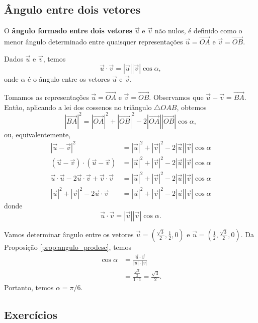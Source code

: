 \subsection{Ângulo entre dois vetores}

O {\bf ângulo formado entre dois vetores} $\vec{u}$ e $\vec{v}$ não nulos, é definido como o menor ângulo determinado entre quaisquer representações $\vec{u} = \overrightarrow{OA}$ e $\vec{v} = \overrightarrow{OB}$.

\begin{prop}\label{prop:angulo_prodesc}
  Dados $\vec{u}$ e $\vec{v}$, temos
  \begin{equation}
    \vec{u}\cdot\vec{v}=|\vec{u}||\vec{v}|\cos\alpha,
  \end{equation}
  onde $\alpha$ é o ângulo entre os vetores $\vec{u}$ e $\vec{v}$.
\end{prop}
\begin{dem}
  Tomamos as representações $\vec{u} = \overrightarrow{OA}$ e $\vec{v} = \overrightarrow{OB}$. Observamos que $\vec{u}-\vec{v} = \overrightarrow{BA}$. Então, aplicando a lei dos cossenos no triângulo $\triangle OAB$, obtemos
  \begin{equation}
    |\overrightarrow{BA}|^2 = |\overrightarrow{OA}|^2 + |\overrightarrow{OB}|^2 - 2|\overrightarrow{OA}||\overrightarrow{OB}|\cos\alpha,
  \end{equation}
  ou, equivalentemente,
  \begin{align}
    |\vec{u}-\vec{v}|^2 &= |\vec{u}|^2+|\vec{v}|^2-2|\vec{u}||\vec{v}|\cos\alpha\\
    (\vec{u}-\vec{v})\cdot(\vec{u}-\vec{v}) &= |\vec{u}|^2+|\vec{v}|^2-2|\vec{u}||\vec{v}|\cos\alpha\\
    \vec{u}\cdot\vec{u}-2\vec{u}\cdot\vec{v}+\vec{v}\cdot\vec{v} &= |\vec{u}|^2+|\vec{v}|^2-2|\vec{u}||\vec{v}|\cos\alpha\\
    |\vec{u}|^2+|\vec{v}|^2-2\vec{u}\cdot\vec{v} &= |\vec{u}|^2+|\vec{v}|^2-2|\vec{u}||\vec{v}|\cos\alpha
  \end{align}
  donde
  \begin{equation}
    \vec{u}\cdot\vec{v} = |\vec{u}||\vec{v}|\cos\alpha.
  \end{equation}
\end{dem}

\begin{ex}
  Vamos determinar ângulo entre os vetores $\displaystyle \vec{u}=\left(\frac{\sqrt{3}}{2},\frac{1}{2},0\right)$ e $\displaystyle \vec{u}=\left(\frac{1}{2},\frac{\sqrt{3}}{2},0\right)$. Da Proposição \ref{prop:angulo_prodesc}, temos
    \begin{align}
      \cos\alpha &= \frac{\vec{u}\cdot\vec{v}}{|u|\cdot|v|}\\
      &= \frac{\frac{\sqrt{3}}{2}}{1\cdot 1} = \frac{\sqrt{3}}{2}.
    \end{align}
    Portanto, temos $\alpha = \pi/6$.
\end{ex}

\subsection*{Exercícios}

\emconstrucao